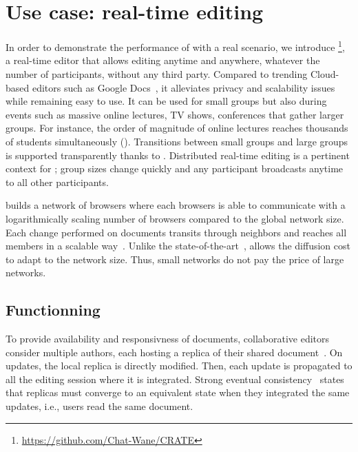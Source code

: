 
\section{Use case: real-time editing}
\label{sec:use-case}

In order to demonstrate the performance of \SPRAY with a real scenario, we
introduce \CRATE \footnote{\url{https://github.com/Chat-Wane/CRATE}}, a
real-time editor that allows editing anytime and anywhere, whatever the number
of participants, without any third party. Compared to trending Cloud-based
editors such as Google Docs~\cite{nichols1995high}, it alleviates privacy and
scalability issues while remaining easy to use.  It can be used for small groups
but also during events such as massive online lectures, TV shows, conferences
that gather larger groups. For instance, the order of magnitude of online
lectures reaches thousands of students simultaneously (\REF). Transitions
between small groups and large groups is supported transparently thanks to
\SPRAY. Distributed real-time editing is a pertinent context for \SPRAY; group
sizes change quickly and any participant broadcasts anytime to all other
participants.

\CRATE builds a network of browsers where each browsers is able to communicate
with a logarithmically scaling number of browsers compared to the global network
size. Each change performed on documents transits through neighbors and reaches
all members in a scalable way~\cite{birman1999bimodal}. Unlike the
state-of-the-art~\cite{tolgyeski2009adaptive, voulgaris2005cyclon}, \SPRAY
allows the diffusion cost to adapt to the network size. Thus, small networks do
not pay the price of large networks.

\subsection{Functionning}

To provide availability and responsivness of documents, collaborative editors
consider multiple authors, each hosting a replica of their shared
document~\cite{saito2005optimistic}.  On updates, the local replica is directly
modified. Then, each update is propagated to all the editing session where it is
integrated. Strong eventual consistency~\cite{bailis2013eventual} states that
replicas must converge to an equivalent state when they integrated the same
updates, i.e., users read the same document.



